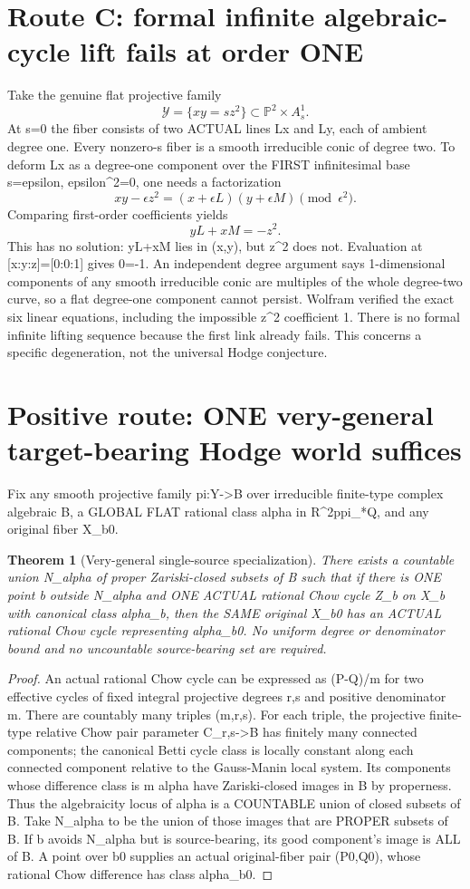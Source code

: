 \documentclass[11pt]{article}
\newtheorem{theorem}{Theorem}
\begin{document}
\section{Route C: formal infinite algebraic-cycle lift fails at order ONE}
Take the genuine flat projective family
\[
\mathcal Y=\{xy=s z^2\}\subset\mathbb P^2\times A^1_s.
\]
At s=0 the fiber consists of two ACTUAL lines Lx and Ly,
each of ambient degree one. Every nonzero-s fiber is a
smooth irreducible conic of degree two.
To deform Lx as a degree-one component over the FIRST
infinitesimal base s=epsilon, epsilon^2=0,
one needs a factorization
\[
xy-\epsilon z^2
=(x+\epsilon L)(y+\epsilon M)\pmod{\epsilon^2}.
\]
Comparing first-order coefficients yields
\[
\boxed{yL+xM=-z^2.}\tag{5}
\]
This has no solution: yL+xM lies in (x,y), but z^2
does not. Evaluation at [x:y:z]=[0:0:1] gives
0=-1. An independent degree argument says
1-dimensional components of any smooth irreducible
conic are multiples of the whole degree-two curve,
so a flat degree-one component cannot persist.
Wolfram verified the exact six linear equations,
including the impossible z^2 coefficient 1.
There is no formal infinite lifting sequence because
the first link already fails. This concerns a
specific degeneration, not the universal Hodge conjecture.

\section{Positive route: ONE very-general target-bearing Hodge world suffices}
Fix any smooth projective family pi:Y->B over
irreducible finite-type complex algebraic B,
a GLOBAL FLAT rational class alpha in R^{2p}pi_*Q,
and any original fiber X_b0.

\begin{theorem}[Very-general single-source specialization]
There exists a countable union N_alpha of proper
Zariski-closed subsets of B such that if there
is ONE point b outside N_alpha and ONE
ACTUAL rational Chow cycle Z_b on X_b with
canonical class alpha_b, then the SAME
original X_b0 has an ACTUAL rational Chow
cycle representing alpha_b0. No uniform
degree or denominator bound and no uncountable
source-bearing set are required.
\end{theorem}
\begin{proof}
An actual rational Chow cycle can be expressed as
(P-Q)/m for two effective cycles of fixed integral
projective degrees r,s and positive denominator m.
There are countably many triples (m,r,s).
For each triple, the projective finite-type relative
Chow pair parameter C_{r,s}->B has finitely many
connected components; the canonical Betti cycle
class is locally constant along each connected
component relative to the Gauss-Manin local system.
Its components whose difference class is m alpha
have Zariski-closed images in B by properness.
Thus the algebraicity locus of alpha is a
COUNTABLE union of closed subsets of B.
Take N_alpha to be the union of those images that
are PROPER subsets of B. If b avoids N_alpha
but is source-bearing, its good component's
image is ALL of B. A point over b0 supplies an
actual original-fiber pair (P0,Q0), whose
rational Chow difference has class alpha_b0.
\end{proof}
\end{document}

